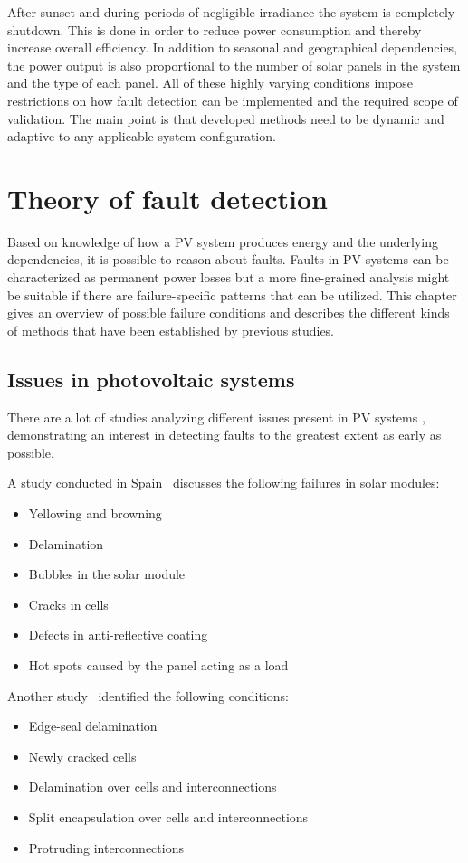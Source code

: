 After sunset and during periods of negligible irradiance the system is completely shutdown.
This is done in order to reduce power consumption and thereby increase overall efficiency.
In addition to seasonal and geographical dependencies, the power output is also proportional to the number of solar panels in the system and the type of each panel.
All of these highly varying conditions impose restrictions on how fault detection can be implemented and the required scope of validation.
The main point is that developed methods need to be dynamic and adaptive to any applicable system configuration.

\chapter{Theory of fault detection}
Based on knowledge of how a PV system produces energy and the underlying dependencies,
it is possible to reason about faults.
Faults in PV systems can be characterized as permanent power losses but a more fine-grained analysis might be suitable if there are failure-specific patterns that can be utilized.
This chapter gives an overview of possible failure conditions and describes the different kinds of methods that have been established by previous studies.

\section{Issues in photovoltaic systems}
There are a lot of studies analyzing different issues present in PV systems \cite{Baltus1997,King2002,Petrone2008}, demonstrating an interest in detecting faults to the greatest extent as early as possible.

A study conducted in Spain~\cite{Munoz2011} discusses the following failures in solar modules:
\begin{itemize}
\item Yellowing and browning
\item Delamination
\item Bubbles in the solar module
\item Cracks in cells
\item Defects in anti-reflective coating
\item Hot spots caused by the panel acting as a load
\end{itemize}

Another study~\cite{Forman1982} identified the following conditions:
\begin{itemize}
\item Edge-seal delamination
\item Newly cracked cells
\item Delamination over cells and interconnections
\item Split encapsulation over cells and interconnections
\item Protruding interconnections
\end{itemize}

